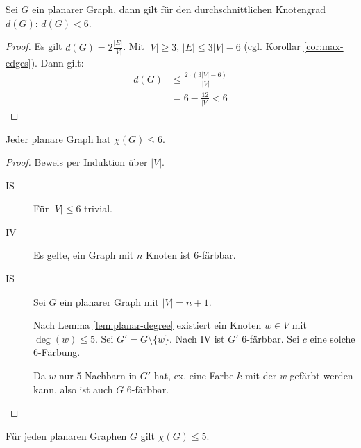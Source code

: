 \begin{lemma}
    \label{lem:planar-degree}
    Sei $ G $ ein planarer Graph, dann gilt für den durchschnittlichen Knotengrad $ d(G) $: $ d(G) < 6 $.
\end{lemma}

\begin{proof}
    Es gilt $ d(G) = 2 \frac{|E|}{|V|} $.
    Mit $ |V| \geq 3 $, $ |E| \leq 3 |V| - 6 $ (cgl. Korollar \ref{cor:max-edges}).
    Dann gilt:
    \begin{align*}
        d(G) & \leq \frac{2 \cdot (3|V| - 6)}{|V|} \\
        &= 6 - \frac{12}{|V|} < 6
    \end{align*}
\end{proof}

\begin{theorem}
    Jeder planare Graph hat $ \chi(G) \leq 6 $.
\end{theorem}

\begin{proof}
    Beweis per Induktion über $ |V| $.
    \begin{description}
        \item[IS] Für $ |V| \leq 6 $ trivial.
        \item[IV] Es gelte, ein Graph mit $ n $ Knoten ist 6-färbbar.
        \item[IS] Sei $ G $ ein planarer Graph mit $ |V| = n + 1 $.

        Nach Lemma \ref{lem:planar-degree} existiert ein Knoten $ w \in V $ mit $ \deg(w) \leq 5 $.
        Sei $ G' = G \setminus \{ w \} $.
        Nach IV ist $ G' $ 6-färbbar.
        Sei $ c $ eine solche 6-Färbung.

        Da $ w $ nur 5 Nachbarn in $ G' $ hat, ex. eine Farbe $ k $ mit der $ w $ gefärbt werden kann, also ist auch $ G $ 6-färbbar.
    \end{description}
\end{proof}

\begin{theorem}
    Für jeden planaren Graphen $ G $ gilt $ \chi(G) \leq 5 $.
\end{theorem}


